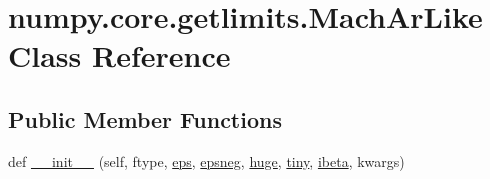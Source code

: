 \hypertarget{classnumpy_1_1core_1_1getlimits_1_1MachArLike}{}\section{numpy.\+core.\+getlimits.\+Mach\+Ar\+Like Class Reference}
\label{classnumpy_1_1core_1_1getlimits_1_1MachArLike}
\subsection*{Public Member Functions}
\begin{DoxyCompactItemize}
\item 
def \hyperlink{classnumpy_1_1core_1_1getlimits_1_1MachArLike_a062b5d5d438a0584a2af12d13b1224af}{\+\_\+\+\_\+init\+\_\+\+\_\+} (self, ftype, \hyperlink{classnumpy_1_1core_1_1getlimits_1_1MachArLike_a4423c6f6e6fc5f254279685f035d827b}{eps}, \hyperlink{classnumpy_1_1core_1_1getlimits_1_1MachArLike_af3258cec2da5b4e01d86fc675084c14d}{epsneg}, \hyperlink{classnumpy_1_1core_1_1getlimits_1_1MachArLike_a5a24980acc1255be93a195955ca9c1c4}{huge}, \hyperlink{classnumpy_1_1core_1_1getlimits_1_1MachArLike_adeb490f514da6510a0c05fd292618d58}{tiny}, \hyperlink{classnumpy_1_1core_1_1getlimits_1_1MachArLike_ac4ecd5068e1341ad1d6d673206108385}{ibeta}, kwargs)
\end{DoxyCompactItemize}
